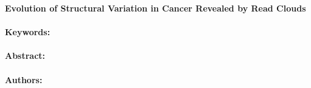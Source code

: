 \noindent
\large {\bf Evolution of Structural Variation in Cancer Revealed by Read Clouds} 


\normalsize 


\noindent \paragraph{Keywords:} 

\noindent \paragraph{Abstract:} 



\noindent \paragraph{Authors:} 

